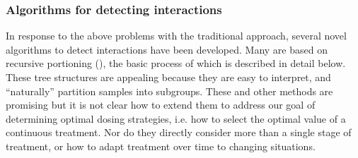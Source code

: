 \documentclass[12pt]{article}
\begin{document}
\subsubsection{Algorithms for detecting interactions} %
\label{ssub:algorithms_for_detecting_interactions}

In response to the above problems with the traditional approach, several novel algorithms to detect interactions have been developed. Many are based on recursive portioning (\cite{Doove2013}), the basic process of which is described in detail below. These tree structures are appealing because they are easy to interpret, and ``naturally'' partition samples into subgroups. These and other methods are promising but it is not clear how to extend them to address our goal of determining optimal dosing strategies, i.e. how to select the optimal value of a continuous treatment. Nor do they directly consider more than a single stage of treatment, or how to adapt treatment over time to changing situations.


%



\end{document}
